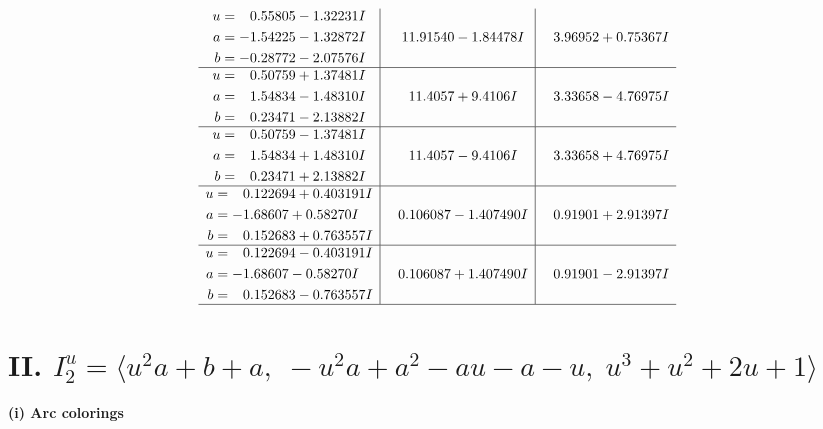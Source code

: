 \documentclass[1p]{elsarticle_modified}
\theoremstyle{definition}
\begin{document}
$$\begin{array}{c|c|c}
\begin{aligned}
u &= \phantom{-}0.55805 - 1.32231 I \\
a &= -1.54225 - 1.32872 I \\
b &= -0.28772 - 2.07576 I\end{aligned}
 & \phantom{-}11.91540 - 1.84478 I & \phantom{-}3.96952 + 0.75367 I \\ \hline\begin{aligned}
u &= \phantom{-}0.50759 + 1.37481 I \\
a &= \phantom{-}1.54834 - 1.48310 I \\
b &= \phantom{-}0.23471 - 2.13882 I\end{aligned}
 & \phantom{-}11.4057 + 9.4106 I & \phantom{-}3.33658 - 4.76975 I \\ \hline\begin{aligned}
u &= \phantom{-}0.50759 - 1.37481 I \\
a &= \phantom{-}1.54834 + 1.48310 I \\
b &= \phantom{-}0.23471 + 2.13882 I\end{aligned}
 & \phantom{-}11.4057 - 9.4106 I & \phantom{-}3.33658 + 4.76975 I \\ \hline\begin{aligned}
u &= \phantom{-}0.122694 + 0.403191 I \\
a &= -1.68607 + 0.58270 I \\
b &= \phantom{-}0.152683 + 0.763557 I\end{aligned}
 & \phantom{-}0.106087 - 1.407490 I & \phantom{-}0.91901 + 2.91397 I \\ \hline\begin{aligned}
u &= \phantom{-}0.122694 - 0.403191 I \\
a &= -1.68607 - 0.58270 I \\
b &= \phantom{-}0.152683 - 0.763557 I\end{aligned}
 & \phantom{-}0.106087 + 1.407490 I & \phantom{-}0.91901 - 2.91397 I\\
 \hline 
 \end{array}$$\newpage\newpage\renewcommand{\arraystretch}{1}
\centering \section*{II. $I^u_{2}= \langle u^2 a+b+a,\;- u^2 a+a^2- a u- a- u,\;u^3+u^2+2 u+1 \rangle$}
\flushleft \textbf{(i) Arc colorings}\\
\end{document}
